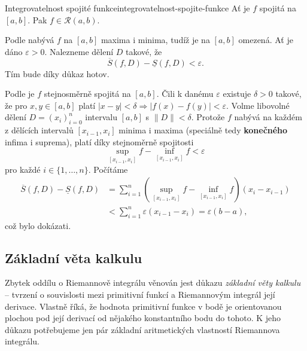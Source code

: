 \begin{theorem}{Integrovatelnost spojité funkce}{integrovatelnost-spojite-funkce}
 Ať je $f$ spojitá na $[a,b]$. Pak $f \in \mathcal{R}(a,b)$.
\end{theorem}
\begin{thmproof}
 Podle  nabývá $f$ na $[a,b]$ maxima i
 minima, tudíž je na $[a,b]$ omezená. Ať je dáno $\varepsilon>0$. Nalezneme
 dělení $D$ takové, že
 \[
  \overline{S}(f,D) - \underline{S}(f,D) < \varepsilon.
 \]
 Tím bude díky  důkaz hotov.

 Podle  je $f$ stejnosměrně spojitá
 na $[a,b]$. Čili k danému $\varepsilon$ existuje $\delta>0$ takové, že pro $x,y
 \in [a,b]$ platí $|x-y|<\delta \Rightarrow |f(x) - f(y)|<\varepsilon$. Volme
 libovolné dělení $D = (x_i)_{i=0}^n$ intervalu $[a,b]$ s $\|D\|<\delta$.
 Protože $f$ nabývá na každém z dělících intervalů $[x_{i-1},x_i]$ minima i
 maxima (speciálně tedy \textbf{konečného} infima i suprema), platí díky
 stejnoměrně spojitosti
 \[
  \sup_{[x_{i-1},x_i]}f - \inf_{[x_{i-1},x_i]}f < \varepsilon
 \]
 pro každé $i \in \{1,\ldots,n\}$. Počítáme
 \begin{align*}
  \overline{S}(f,D) - \underline{S}(f,D) &= \sum_{i = 1}^{n}
  (\sup_{[x_{i-1},x_i]}f - \inf_{[x_{i-1},x_i]} f)(x_i - x_{i-1})\\
                                         &< \sum_{i = 1}^{n} \varepsilon(x_{i-1}
                                         - x_i) = \varepsilon(b-a),
 \end{align*}
 což bylo dokázati.
\end{thmproof}

\subsection{Základní věta kalkulu}
\label{ssec:zakladni-veta-kalkulu}

Zbytek oddílu o Riemannově integrálu věnován jest důkazu \emph{základní věty
kalkulu} -- tvrzení o souvislosti mezi primitivní funkcí a Riemannovým integrál
její derivace. Vlastně říká, že hodnota primitivní funkce v bodě je orientovanou
plochou pod její derivací od nějakého konstantního bodu do tohoto. K jeho důkazu
potřebujeme jen pár základní aritmetických vlastností Riemannova integrálu.

